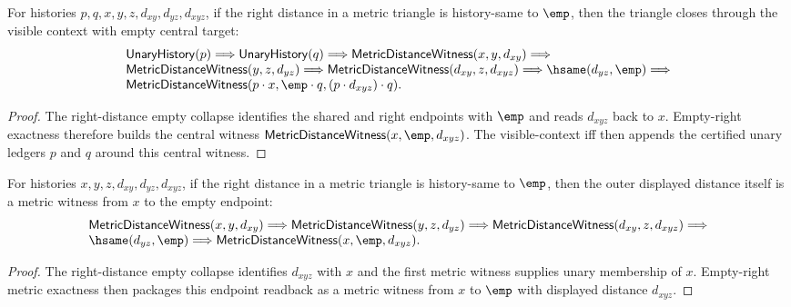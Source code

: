 \begin{theorem}
\label{thm:metric-distance-witness-triangle-right-distance-empty-visible-context-closed}
For histories $p,q,x,y,z,d_{xy},d_{yz},d_{xyz}$, if the right distance in a
metric triangle is history-same to $\emp$, then the triangle closes through
the visible context with empty central target:
$$
\begin{array}{l}
\mathsf{UnaryHistory}(p)\Longrightarrow\mathsf{UnaryHistory}(q)\Longrightarrow
\mathsf{MetricDistanceWitness}(x,y,d_{xy})\Longrightarrow\\
\mathsf{MetricDistanceWitness}(y,z,d_{yz})\Longrightarrow
\mathsf{MetricDistanceWitness}(d_{xy},z,d_{xyz})\Longrightarrow
\hsame(d_{yz},\emp)\Longrightarrow\\
\mathsf{MetricDistanceWitness}(p\cdot x,\emp\cdot q,(p\cdot d_{xyz})\cdot q).
\end{array}
$$
\end{theorem}
\begin{proof}
The right-distance empty collapse identifies the shared and right endpoints
with $\emp$ and reads $d_{xyz}$ back to $x$. Empty-right exactness therefore
builds the central witness $\mathsf{MetricDistanceWitness}(x,\emp,d_{xyz})$.
The visible-context iff then appends the certified unary ledgers $p$ and $q$
around this central witness.
\end{proof}

\begin{theorem}
\label{thm:metric-distance-witness-triangle-right-distance-empty-spine-witness}
For histories $x,y,z,d_{xy},d_{yz},d_{xyz}$, if the right distance in a
metric triangle is history-same to $\emp$, then the outer displayed distance
itself is a metric witness from $x$ to the empty endpoint:
$$
\begin{array}{l}
\mathsf{MetricDistanceWitness}(x,y,d_{xy})\Longrightarrow
\mathsf{MetricDistanceWitness}(y,z,d_{yz})\Longrightarrow
\mathsf{MetricDistanceWitness}(d_{xy},z,d_{xyz})\Longrightarrow\\
\hsame(d_{yz},\emp)\Longrightarrow
\mathsf{MetricDistanceWitness}(x,\emp,d_{xyz}).
\end{array}
$$
\end{theorem}
\begin{proof}
The right-distance empty collapse identifies $d_{xyz}$ with $x$ and the first
metric witness supplies unary membership of $x$. Empty-right metric exactness
then packages this endpoint readback as a metric witness from $x$ to $\emp$
with displayed distance $d_{xyz}$.
\end{proof}

